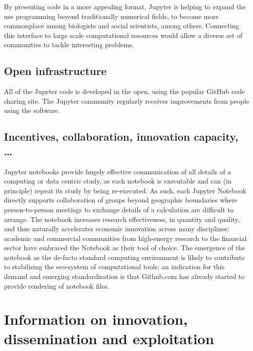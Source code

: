 By presenting code in a more appealing format, Jupyter is helping to expand
the use programming beyond traditionally numerical fields, to become more
commonplace among biologists and social scientists, among others. Connecting
this interface to large scale computational resources would allow a diverse set
of communities to tackle interesting problems.


\subsection{Open infrastructure}

All of the Jupyter code is developed in the open, using the popular GitHub
code sharing site. The Jupyter community regularly receives improvements from
people using the software.

\subsection{Incentives, collaboration, innovation capacity, \ldots}
Jupyter notebooks provide hugely effective communication of all
details of a computing or data centric study, as each notebook is
executable and can (in principle) repeat its study by being
re-executed. As such, each Jupyter Notebook directly supports
collaboration of groups beyond geographic boundaries where
person-to-person meetings to exchange details of a calculation are
difficult to arrange. The notebook increases research effectiveness,
in quantity and quality, and thus naturally accelerates economic
innovation across many disciplines: academic and commercial
communities from high-energy research to the financial sector have
embraced the Notebook as their tool of choice. The emergence of the
notebook as the de-facto standard computing environment is likely to
contribute to stabilising the eco-system of computational tools; an
indication for this demand and emerging standardisation is that
Github.com has already started to provide rendering of notebook files.




\section{Information on innovation, dissemination and exploitation}

